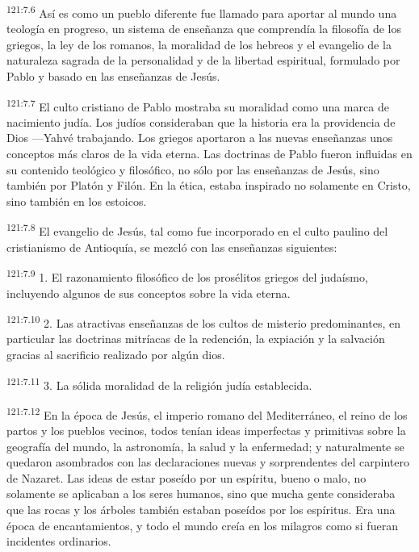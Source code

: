 \par 
\textsuperscript{121:7.6} Así es como un pueblo diferente fue llamado para aportar al mundo una teología en progreso, un sistema de enseñanza que comprendía la filosofía de los griegos, la ley de los romanos, la moralidad de los hebreos y el evangelio de la naturaleza sagrada de la personalidad y de la libertad espiritual, formulado por Pablo y basado en las enseñanzas de Jesús.

\par 
\textsuperscript{121:7.7} El culto cristiano de Pablo mostraba su moralidad como una marca de nacimiento judía. Los judíos consideraban que la historia era la providencia de Dios ---Yahvé trabajando. Los griegos aportaron a las nuevas enseñanzas unos conceptos más claros de la vida eterna. Las doctrinas de Pablo fueron influidas en su contenido teológico y filosófico, no sólo por las enseñanzas de Jesús, sino también por Platón y Filón. En la ética, estaba inspirado no solamente en Cristo, sino también en los estoicos.

\par 
\textsuperscript{121:7.8} El evangelio de Jesús, tal como fue incorporado en el culto paulino del cristianismo de Antioquía, se mezcló con las enseñanzas siguientes:

\par 
\textsuperscript{121:7.9} 1. El razonamiento filosófico de los prosélitos griegos del judaísmo, incluyendo algunos de sus conceptos sobre la vida eterna.

\par 
\textsuperscript{121:7.10} 2. Las atractivas enseñanzas de los cultos de misterio predominantes, en particular las doctrinas mitríacas de la redención, la expiación y la salvación gracias al sacrificio realizado por algún dios.

\par 
\textsuperscript{121:7.11} 3. La sólida moralidad de la religión judía establecida.

\par 
\textsuperscript{121:7.12} En la época de Jesús, el imperio romano del Mediterráneo, el reino de los partos y los pueblos vecinos, todos tenían ideas imperfectas y primitivas sobre la geografía del mundo, la astronomía, la salud y la enfermedad; y naturalmente se quedaron asombrados con las declaraciones nuevas y sorprendentes del carpintero de Nazaret. Las ideas de estar poseído por un espíritu, bueno o malo, no solamente se aplicaban a los seres humanos, sino que mucha gente consideraba que las rocas y los árboles también estaban poseídos por los espíritus. Era una época de encantamientos, y todo el mundo creía en los milagros como si fueran incidentes ordinarios.

